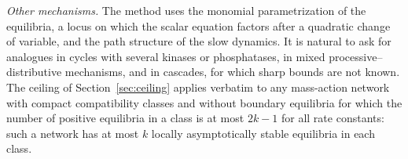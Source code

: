 \emph{Other mechanisms.} The method uses the monomial parametrization of the equilibria, a
locus on which the scalar equation factors after a quadratic change of variable, and the path
structure of the slow dynamics. It is natural to ask for analogues in cycles with several
kinases or phosphatases, in mixed processive--distributive mechanisms, and in cascades, for
which sharp bounds are not known. The ceiling of Section~\ref{sec:ceiling} applies verbatim to
any mass-action network with compact compatibility classes and without boundary equilibria
for which the number of positive equilibria in a class is at most \(2k-1\) for all rate
constants: such a network has at most \(k\) locally asymptotically stable equilibria in each
class.
